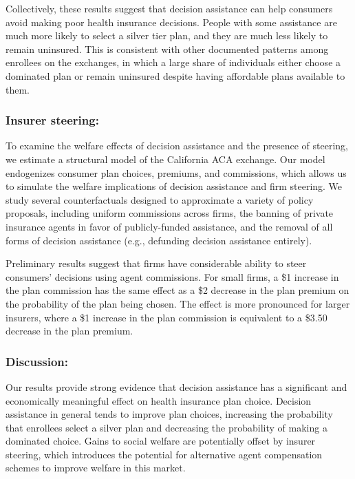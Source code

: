 \documentclass[12pt]{article}
\begin{document}
Collectively, these results suggest that decision assistance can help consumers avoid making poor health insurance decisions. People with some assistance are much more likely to select a silver tier plan, and they are much less likely to remain uninsured. This is consistent with other documented patterns among enrollees on the exchanges, in which a large share of individuals either choose a dominated plan or remain uninsured despite having affordable plans available to them. 

\subsubsection{Insurer steering:}
To examine the welfare effects of decision assistance and the presence of steering, we estimate a structural model of the California ACA exchange. Our model endogenizes consumer plan choices, premiums, and commissions, which allows us to simulate the welfare implications of decision assistance and firm steering. We study several counterfactuals designed to approximate a variety of policy proposals, including uniform commissions across firms, the banning of private insurance agents in favor of publicly-funded assistance, and the removal of all forms of decision assistance (e.g., defunding decision assistance entirely).

Preliminary results suggest that firms have considerable ability to steer consumers' decisions using agent commissions. For small firms, a \$1 increase in the plan commission has the same effect as a \$2 decrease in the plan premium on the probability of the plan being chosen. The effect is more pronounced for larger insurers, where a \$1 increase in the plan commission is equivalent to a \$3.50 decrease in the plan premium. 


\subsubsection{Discussion:}
Our results provide strong evidence that decision assistance has a significant and economically meaningful effect on health insurance plan choice. Decision assistance in general tends to improve plan choices, increasing the probability that enrollees select a silver plan and decreasing the probability of making a dominated choice. Gains to social welfare are potentially offset by insurer steering, which introduces the potential for alternative agent compensation schemes to improve welfare in this market.


\pagebreak



\clearpage
\newpage
\end{document}
